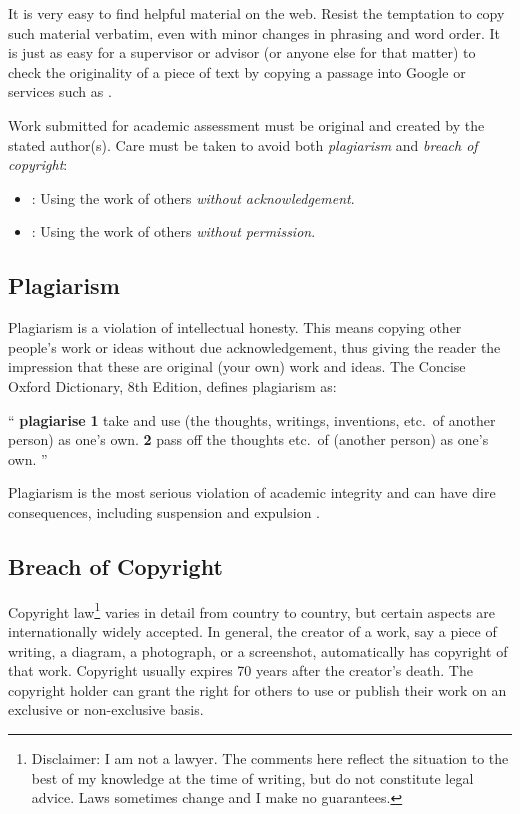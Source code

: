 It is very easy to find helpful material on the web. Resist the
temptation to copy such material verbatim, even with minor changes in
phrasing and word order. It is just as easy for a supervisor or
advisor (or anyone else for that matter) to check the originality of a
piece of text by copying a passage into Google or services such as
\parencite{PlagiarismOrg}.

Work submitted for academic assessment must be original and created by
the stated author(s). Care must be taken to avoid both
\emph{plagiarism} and \emph{breach of copyright}:
\begin{itemize}
      \item {}: Using the work of others \emph{without
                  acknowledgement}.

      \item {}: Using the work of others
            \emph{without permission}.
\end{itemize}





\subsection{Plagiarism}

Plagiarism is a violation of intellectual honesty. This means copying
other people's work or ideas without due acknowledgement, thus giving
the reader the impression that these are original (your own) work and
ideas. The Concise Oxford Dictionary, 8th Edition, defines plagiarism
as:
\begin{displayquote}
      \enquote{
            \textbf{plagiarise}
            \textbf{1} take and use (the thoughts, writings, inventions, etc.\ of
            another person) as one's own. \textbf{2} pass off the thoughts etc.\
            of (another person) as one's own.
      }
\end{displayquote}
Plagiarism is the most serious violation of academic integrity and can
have dire consequences, including suspension and expulsion
\parencite{Reisman2005}.



\subsection{Breach of Copyright}

Copyright law\footnote{Disclaimer: I am not a lawyer. The comments
      here reflect the situation to the best of my knowledge at the time
      of writing, but do not constitute legal advice. Laws sometimes
      change and I make no guarantees.} varies in detail from country to
country, but certain aspects are internationally widely accepted. In
general, the creator of a work, say a piece of writing, a diagram, a
photograph, or a screenshot, automatically has copyright of that
work. Copyright usually expires 70 years after the creator's
death. The copyright holder can grant the right for others to use or
publish their work on an exclusive or non-exclusive basis.

